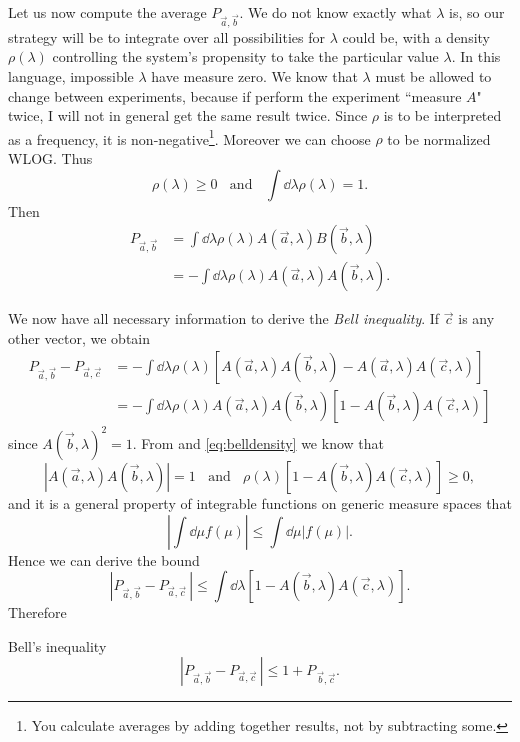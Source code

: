 Let us now compute the average $P_{\vec{a},\vec{b}}$. We do not know 
exactly what $\lambda$ is, so our strategy will be to integrate over all 
possibilities for $\lambda$
could be, with a density $\rho(\lambda)$ controlling the system's propensity
to take the particular value $\lambda$. In this language, impossible
$\lambda$ have measure zero. We know that $\lambda$ must be allowed to
change between experiments, because if perform the experiment ``measure $A$"
twice, I will not in general get the same result twice. Since $\rho$ is to
be interpreted as a frequency, it is non-negative\footnote{You calculate
averages by adding together results, not by subtracting some.}.
Moreover we can choose $\rho$ to be normalized WLOG. Thus
\begin{equation}\label{eq:belldensity}
  \rho(\lambda)\geq 0~~~~\text{and}~~~~\int\dd{\lambda}\rho(\lambda)=1.
\end{equation}
Then
\begin{equation}\begin{aligned}
  P_{\vec{a},\vec{b}}
         &=\int\dd{\lambda}\rho(\lambda)A(\vec{a},\lambda)B(\vec{b},\lambda)\\
         &=-\int\dd{\lambda}\rho(\lambda)A(\vec{a},\lambda)A(\vec{b},\lambda).
\end{aligned}\end{equation}

We now have all necessary information to derive the {\it Bell inequality}. 
If $\vec{c}$ is any other vector, we obtain
\begin{equation}\begin{aligned}
  P_{\vec{a},\vec{b}}-P_{\vec{a},\vec{c}}
   &=-\int\dd{\lambda}\rho(\lambda)
      \left[A(\vec{a},\lambda)A(\vec{b},\lambda)-
            A(\vec{a},\lambda)A(\vec{c},\lambda)\right]\\
   &=-\int\dd{\lambda}\rho(\lambda)
      A(\vec{a},\lambda)A(\vec{b},\lambda)
      \left[1-A(\vec{b},\lambda)A(\vec{c},\lambda)\right]
\end{aligned}\end{equation}
since $A(\vec{b},\lambda)^2=1$. From  and
\eqref{eq:belldensity} we know that
\begin{equation}
  |A(\vec{a},\lambda)A(\vec{b},\lambda)|=1~~~~\text{and}~~~~
  \rho(\lambda)\left[1-A(\vec{b},\lambda)A(\vec{c},\lambda)\right]\geq0,
\end{equation}
and it is a general property of integrable functions on generic
measure spaces that
\begin{equation}
  \left|\int\dd{\mu}f(\mu)\right|\leq\int\dd{\mu}|f(\mu)|.
\end{equation}
Hence we can derive the bound
\begin{equation}
  |P_{\vec{a},\vec{b}}-P_{\vec{a},\vec{c}}\,|
  \leq\int\dd{\lambda}\left[1-A(\vec{b},\lambda)A(\vec{c},\lambda)\right].
\end{equation}
Therefore
\begin{theorem}{Bell's inequality}{}
  $$
  |P_{\vec{a},\vec{b}}-P_{\vec{a},\vec{c}}\,|
  \leq1+P_{\,\vec{b},\vec{c}}.
  $$
\end{theorem}

